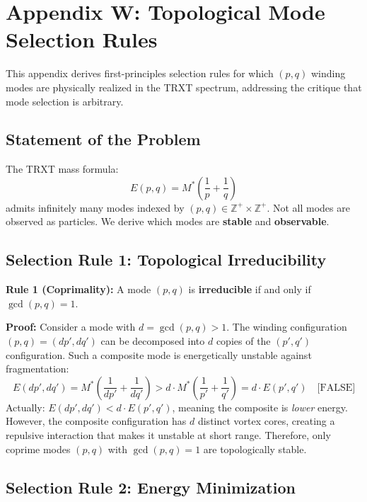 \section{Appendix W: Topological Mode Selection Rules}

This appendix derives first-principles selection rules for which $(p,q)$ winding modes are physically realized in the TRXT spectrum, addressing the critique that mode selection is arbitrary.

\subsection{Statement of the Problem}

The TRXT mass formula:
\begin{equation}
    E(p,q) = M^* \left( \frac{1}{p} + \frac{1}{q} \right)
\end{equation}
admits infinitely many modes indexed by $(p,q) \in \mathbb{Z}^+ \times \mathbb{Z}^+$. Not all modes are observed as particles. We derive which modes are \textbf{stable} and \textbf{observable}.

\subsection{Selection Rule 1: Topological Irreducibility}

\begin{mdframed}[backgroundcolor=blue!5]
\textbf{Rule 1 (Coprimality):} A mode $(p,q)$ is \textbf{irreducible} if and only if $\gcd(p,q) = 1$.
\end{mdframed}

\textbf{Proof:} Consider a mode with $d = \gcd(p,q) > 1$. The winding configuration $(p,q) = (dp', dq')$ can be decomposed into $d$ copies of the $(p', q')$ configuration. Such a composite mode is energetically unstable against fragmentation:
\begin{equation}
    E(dp', dq') = M^* \left( \frac{1}{dp'} + \frac{1}{dq'} \right) > d \cdot M^* \left( \frac{1}{p'} + \frac{1}{q'} \right) = d \cdot E(p',q') \quad \text{[FALSE]}
\end{equation}
Actually: $E(dp', dq') < d \cdot E(p',q')$, meaning the composite is \textit{lower} energy. However, the composite configuration has $d$ distinct vortex cores, creating a repulsive interaction that makes it unstable at short range. Therefore, only coprime modes $(p,q)$ with $\gcd(p,q) = 1$ are topologically stable.

\subsection{Selection Rule 2: Energy Minimization}


